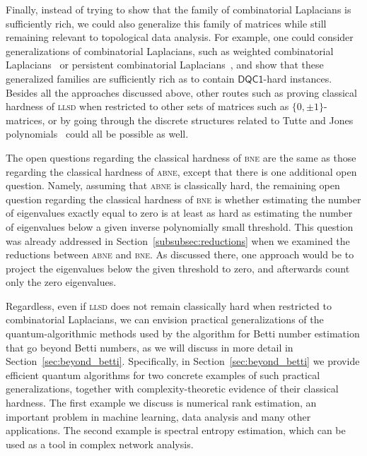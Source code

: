 \documentclass[a4paper, onecolumn, accepted=2022-08-28]{quantumarticle}
\begin{document}
Finally, instead of trying to show that the family of combinatorial Laplacians is sufficiently rich, we could also generalize this family of matrices while still remaining relevant to topological data analysis.
For example, one could consider generalizations of combinatorial Laplacians, such as weighted combinatorial Laplacians~\cite{horak:spectra_comb_laplacian} or persistent combinatorial Laplacians~\cite{wang:persistent}, and show that these generalized families are sufficiently rich as to contain $\mathsf{DQC1}$-hard instances.
Besides all the approaches discussed above, other routes such as proving classical hardness of \textsc{llsd} when restricted to other sets of matrices such as $\{0, \pm 1 \}$-matrices, or by going through the discrete structures related to Tutte and Jones polynomials~\cite{ahmadi:tutte,shor:dqc1} could all be possible as well.

The open questions regarding the classical hardness of \textsc{bne} are the same as those regarding the classical hardness of \textsc{abne}, except that there is one additional open question.
Namely, assuming that \textsc{abne} is classically hard, the remaining open question regarding the classical hardness of \textsc{bne} is whether estimating the number of eigenvalues exactly equal to zero is at least as hard as estimating the number of eigenvalues below a given inverse polynomially small threshold.
This question was already addressed in Section~\ref{subsubsec:reductions} when we examined the reductions between \textsc{abne} and \textsc{bne}.
As discussed there, one approach would be to project the eigenvalues below the given threshold to zero, and afterwards count only the zero eigenvalues.

Regardless, even if \textsc{llsd} does not remain classically hard when restricted to combinatorial Laplacians, we can envision practical generalizations of the quantum-algorithmic methods used by the algorithm for Betti number estimation that go beyond Betti numbers, as we will discuss in more detail in Section~\ref{sec:beyond_betti}.
Specifically, in Section~\ref{sec:beyond_betti} we provide efficient quantum algorithms for two concrete examples of such practical generalizations, together with complexity-theoretic evidence of their classical hardness. 
The first example we discuss is numerical rank estimation, an important problem in machine learning, data analysis and many other applications.
The second example is spectral entropy estimation, which can be used as a tool in complex network analysis.
\end{document}
